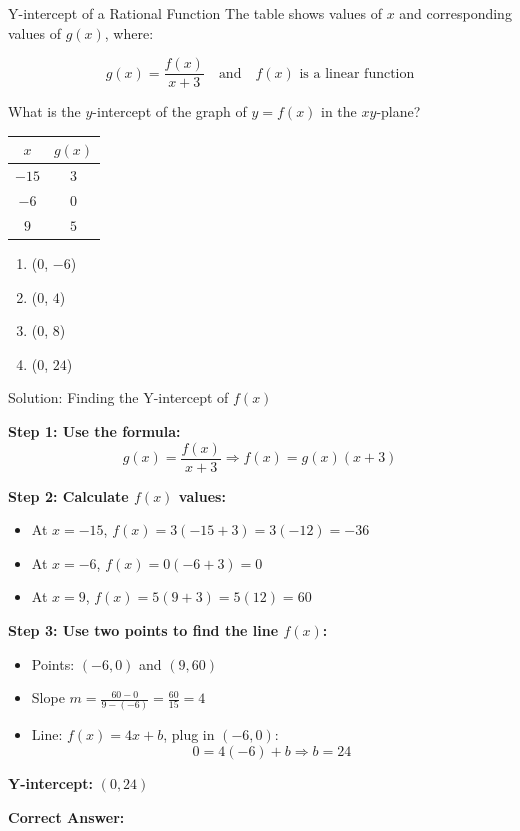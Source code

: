 \documentclass{beamer}
\begin{document}
\begin{frame}{Y-intercept of a Rational Function}
\small
The table shows values of $x$ and corresponding values of $g(x)$, where:

\[
g(x) = \frac{f(x)}{x + 3}
\quad \text{and} \quad f(x) \text{ is a linear function}
\]

What is the $y$-intercept of the graph of $y = f(x)$ in the $xy$-plane?

\begin{center}
\begin{tabular}{|c|c|}
\hline
$x$ & $g(x)$ \\
\hline
$-15$ & $3$ \\
$-6$ & $0$ \\
$9$ & $5$ \\
\hline
\end{tabular}
\end{center}

\begin{enumerate}
    \item[A.] (0, $-6$)
    \item[B.] (0, $4$)
    \item[C.] (0, $8$)
    \item[D.] (0, $24$)
\end{enumerate}
\end{frame}

\begin{frame}{Solution: Finding the Y-intercept of $f(x)$}
\small

\textbf{Step 1: Use the formula:}
\[
g(x) = \frac{f(x)}{x + 3} \Rightarrow f(x) = g(x)(x + 3)
\]

\textbf{Step 2: Calculate $f(x)$ values:}
\begin{itemize}
    \item At $x = -15$, $f(x) = 3(-15 + 3) = 3(-12) = -36$
    \item At $x = -6$, $f(x) = 0(-6 + 3) = 0$
    \item At $x = 9$, $f(x) = 5(9 + 3) = 5(12) = 60$
\end{itemize}

\textbf{Step 3: Use two points to find the line $f(x)$:}
\begin{itemize}
    \item Points: $(-6, 0)$ and $(9, 60)$
    \item Slope $m = \frac{60 - 0}{9 - (-6)} = \frac{60}{15} = 4$
    \item Line: $f(x) = 4x + b$, plug in $(-6, 0)$:
    \[
    0 = 4(-6) + b \Rightarrow b = 24
    \]
\end{itemize}

\textbf{Y-intercept:} $(0, 24)$

\textbf{Correct Answer:} 
\end{frame}
\end{document}
